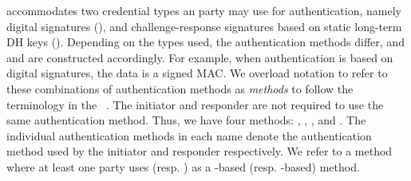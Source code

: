 \mEdhoc{} accommodates two credential types
an party may use for authentication, 
%
namely digital signatures (\mSig), and challenge-response signatures based on
static long-term DH keys (\mStat).
%
%
Depending on the types used, the authentication methods differ,
and \mAuthi{} and \mAuthr{} are constructed accordingly.
%
For example, when authentication is based on digital signatures, the data is a
signed MAC.
%
%
We overload notation to refer to these combinations of authentication methods as
\emph{methods} to follow the terminology in the \mEdhoc{}
\mSpec{}~\cite{selander-lake-edhoc-01}.
%
The initiator and responder are not required to use the same authentication
method.
%
Thus, we have four methods: \mSigSig, \mSigStat, \mStatStat, and \mStatSig.
%
The individual authentication methods in each name denote the authentication
method used by the initiator and responder respectively.
%
We refer to a method where at least one party uses \mSig{} (resp. \mStat) as a \mSig-based (resp. \mStat-based)
method.
%

%

 
